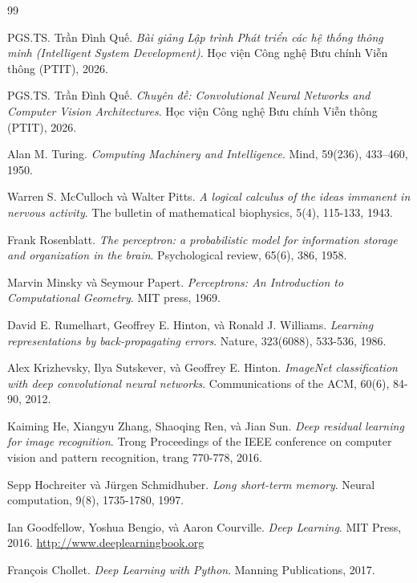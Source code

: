 \documentclass[12pt,a4paper]{article}
\begin{document}
\newpage
{}
\begin{thebibliography}{99}

PGS.TS. Trần Đình Quế. \textit{Bài giảng Lập trình Phát triển các hệ thống thông minh (Intelligent System Development)}. Học viện Công nghệ Bưu chính Viễn thông (PTIT), 2026.

PGS.TS. Trần Đình Quế. \textit{Chuyên đề: Convolutional Neural Networks and Computer Vision Architectures}. Học viện Công nghệ Bưu chính Viễn thông (PTIT), 2026.


Alan M. Turing. \textit{Computing Machinery and Intelligence}. Mind, 59(236), 433–460, 1950.

Warren S. McCulloch và Walter Pitts. \textit{A logical calculus of the ideas immanent in nervous activity}. The bulletin of mathematical biophysics, 5(4), 115-133, 1943.

Frank Rosenblatt. \textit{The perceptron: a probabilistic model for information storage and organization in the brain}. Psychological review, 65(6), 386, 1958.

Marvin Minsky và Seymour Papert. \textit{Perceptrons: An Introduction to Computational Geometry}. MIT press, 1969.

David E. Rumelhart, Geoffrey E. Hinton, và Ronald J. Williams. \textit{Learning representations by back-propagating errors}. Nature, 323(6088), 533-536, 1986.

Alex Krizhevsky, Ilya Sutskever, và Geoffrey E. Hinton. \textit{ImageNet classification with deep convolutional neural networks}. Communications of the ACM, 60(6), 84-90, 2012.

Kaiming He, Xiangyu Zhang, Shaoqing Ren, và Jian Sun. \textit{Deep residual learning for image recognition}. Trong Proceedings of the IEEE conference on computer vision and pattern recognition, trang 770-778, 2016.

Sepp Hochreiter và Jürgen Schmidhuber. \textit{Long short-term memory}. Neural computation, 9(8), 1735-1780, 1997.


Ian Goodfellow, Yoshua Bengio, và Aaron Courville. \textit{Deep Learning}. MIT Press, 2016. \url{http://www.deeplearningbook.org}

François Chollet. \textit{Deep Learning with Python}. Manning Publications, 2017.


\end{thebibliography}
\end{document}
